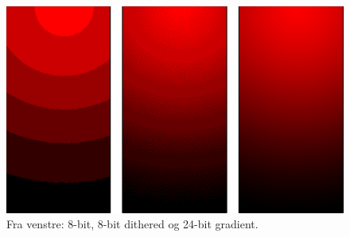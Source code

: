 \begin{figure}[h]
	\centering
	\includegraphics[width=0.7\linewidth]{figs/spm01/gradient}
	\caption{Fra venstre: 8-bit, 8-bit dithered og 24-bit gradient.}
	\label{fig:gradient}
\end{figure}
